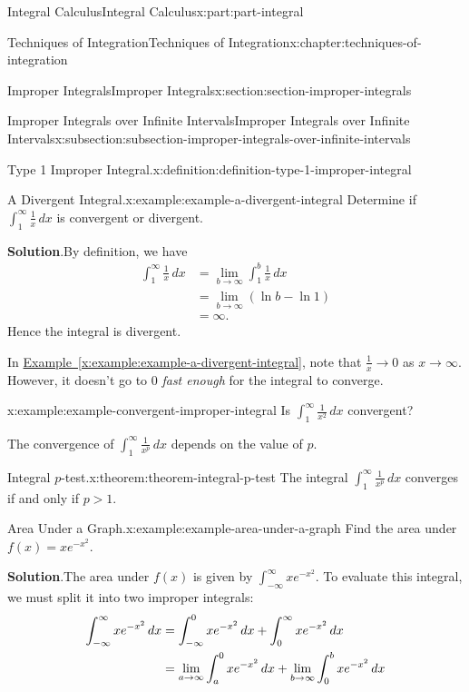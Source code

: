 \documentclass[twoside,10pt,]{book}
\newcommand{\blocktitlefont}{\relax}
\newcommand{\xreffont}{\relax}
\numberwithin{equation}{part}
\newcommand{\gt}{>}
\begin{document}
\begin{partptx}{Integral Calculus}{}{Integral Calculus}{}{}{x:part:part-integral}
\begin{chapterptx}{Techniques of Integration}{}{Techniques of Integration}{}{}{x:chapter:techniques-of-integration}
\begin{sectionptx}{Improper Integrals}{}{Improper Integrals}{}{}{x:section:section-improper-integrals}
\begin{subsectionptx}{Improper Integrals over Infinite Intervals}{}{Improper Integrals over Infinite Intervals}{}{}{x:subsection:subsection-improper-integrals-over-infinite-intervals}
\begin{definition}{Type 1 Improper Integral.}{x:definition:definition-type-1-improper-integral}
\begin{equation*}
\end{equation*}
%
\end{definition}
\begin{example}{A Divergent Integral.}{x:example:example-a-divergent-integral}%
Determine if \(\int_{1}^{\infty}\frac{1}{x}\,dx\) is convergent or divergent.%
\par\smallskip%
\noindent\textbf{\blocktitlefont Solution}.\hypertarget{g:solution:idp105549278999584}{}\quad{}By definition, we have%
\begin{align*}
\int_{1}^{\infty}\frac{1}{x}\,dx & = \lim_{b\to\infty}\int_{1}^{b}\frac{1}{x}\,dx \\
& = \lim_{b\to\infty}(\ln b - \ln 1) \\
& = \infty. 
\end{align*}
Hence the integral is divergent.%
\end{example}
In \hyperref[x:example:example-a-divergent-integral]{Example~{\xreffont\ref{x:example:example-a-divergent-integral}}}, note that \(\frac{1}{x}\to0\) as \(x\to\infty\). However, it doesn't go to \(0\) \emph{fast enough} for the integral to converge.%
\begin{example}{}{x:example:example-convergent-improper-integral}%
Is \(\int_{1}^{\infty}\frac{1}{x^{2}}\,dx\) convergent?%
\end{example}
The convergence of \(\int_{1}^{\infty}\frac{1}{x^{p}}\,dx\) depends on the value of \(p\).%
\begin{theorem}{Integral \(p\)-test.}{}{x:theorem:theorem-integral-p-test}%
The integral \(\int_{1}^{\infty}\frac{1}{x^{p}}\,dx\) converges if and only if \(p \gt 1\).%
\end{theorem}
\begin{example}{Area Under a Graph.}{x:example:example-area-under-a-graph}%
Find the area under \(f(x) = xe^{-x^{2}}\).%
\par\smallskip%
\noindent\textbf{\blocktitlefont Solution}.\hypertarget{g:solution:idp105549279008672}{}\quad{}The area under \(f(x)\) is given by \(\int_{-\infty}^{\infty}xe^{-x^{2}}\). To evaluate this integral, we must split it into two improper integrals:%
\begin{align*}
\int_{-\infty}^{\infty}xe^{-x^{2}}\,dx & = \int_{-\infty}^{0}xe^{-x^{2}}\,dx + \int_{0}^{\infty}xe^{-x^{2}}\,dx \\
& = \lim_{a\to\-\infty}\int_{a}^{0}xe^{-x^{2}}\,dx + \lim_{b\to\infty}\int_{0}^{b}xe^{-x^{2}}\,dx 
\end{align*}
%
\par

\end{example}
\end{subsectionptx}
\end{sectionptx}
\end{chapterptx}
\end{partptx}
\end{document}
